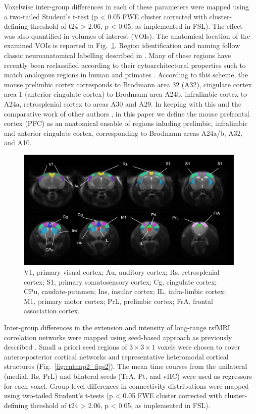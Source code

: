 Voxelwise inter-group differences in each of these parameters were mapped using
a two-tailed Student’s t-test (p < 0.05 FWE cluster corrected with
cluster-defining threshold of t24 > 2.06, p < 0.05, as implemented in FSL). The
effect was also quantified in volumes of interest (VOIs). The anatomical
location of the examined VOIs is reported in Fig.~\ref{fig:cntnap2_figs1}.
Region identification and naming follow classic neuroanatomical labelling
described in \parencite{paxinos2004}.  Many of these regions have recently been
reclassified according to their cytoarchitectural properties such to match
analogous regions in human and primates \parencite{vogt2014}. According to this
scheme, the mouse prelimbic cortex corresponds to Brodmann area 32 (A32),
cingulate cortex area 1 (anterior cingulate cortex) to Brodmann area A24b,
infralimbic cortex to A24a, retrosplenial cortex to areas A30 and A29. In
keeping with this and the comparative work of other authors
\parencite{ongur2000}, in this paper we define the mouse prefrontal cortex (PFC)
as an anatomical ensable of regions inluding prelimbic, infralimbic and anterior
cingulate cortex, corresponding to Brodmann areas A24a/b, A32, and A10.

\begin{figure}[th] 
    \centering
    \includegraphics[scale=0.6]{figures/cntnap2_figure_s1.png}
    \decoRule
    \caption[Volumes of interest used in functional connectivity mappings.]{V1,
    primary visual cortex; Au, auditory cortex; Rs, retrosplenial cortex; S1,
    primary somatosensory cortex; Cg, cingulate cortex; CPu, caudate-putamen;
    Ins, insular cortex; IL, infra-limbic cortex; M1, primary motor cortex; PrL,
    prelimbic cortex; FrA, frontal association cortex.}
    \label{fig:cntnap2_figs1}
\end{figure}

Inter-group differences in the extension and intensity of long-range rsfMRI
correlation networks were mapped using seed-based approach as previously
described \parencite{sforazzini2016}. Small a priori seed regions of $3 \times 3
\times 1$ voxels were chosen to cover antero-posterior cortical networks and
representative heteromodal cortical structures (Fig.~\ref{fig:cntnap2_figs2}).
The mean time courses from the unilateral (medial, Rs, PrL) and bilateral seeds
(TeA, Pt, and vHC) were used as regressors for each voxel. Group level
differences in connectivity distributions were mapped using two-tailed Student’s
t-tests (p < 0.05 FWE cluster corrected with cluster-defining threshold of t24 >
2.06, p < 0.05, as implemented in FSL).

